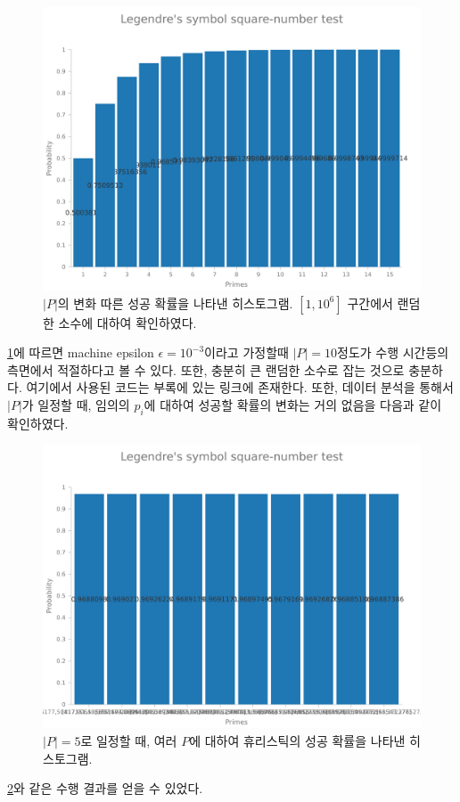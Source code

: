 \documentclass[a4paper]{article}
\begin{document}
        \begin{figure}[h]
            \centering
            \includegraphics[width=\textwidth]{legendre-test.png}
            \caption{$|P|$의 변화 따른 성공 확률을 나타낸 히스토그램. $[1,10^{6}]$ 구간에서 랜덤한 소수에 대하여 확인하였다.}
            \label{fig1}
        \end{figure}
        \ref{fig1}에 따르면 machine epsilon $\epsilon = 10^{-3}$이라고 가정할때 $|P|=10$정도가 수행 시간등의 측면에서 적절하다고 볼 수 있다.
        또한, 충분히 큰 랜덤한 소수로 잡는 것으로 충분하다.
        여기에서 사용된 코드는 부록에 있는 링크에 존재한다.
        또한, 데이터 분석을 통해서 $|P|$가 일정할 때, 임의의 $p_{i}$에 대하여 성공할 확률의 변화는 거의 없음을 다음과 같이 확인하였다.
        \begin{figure}[h]
            \centering
            \includegraphics[width=\textwidth]{legendre-test-p.png}
            \caption{$|P|=5$로 일정할 때, 여러 $P$에 대하여 휴리스틱의 성공 확률을 나타낸 히스토그램.}
            \label{fig2}
        \end{figure}
        \ref{fig2}와 같은 수행 결과를 얻을 수 있었다.
\end{document}
